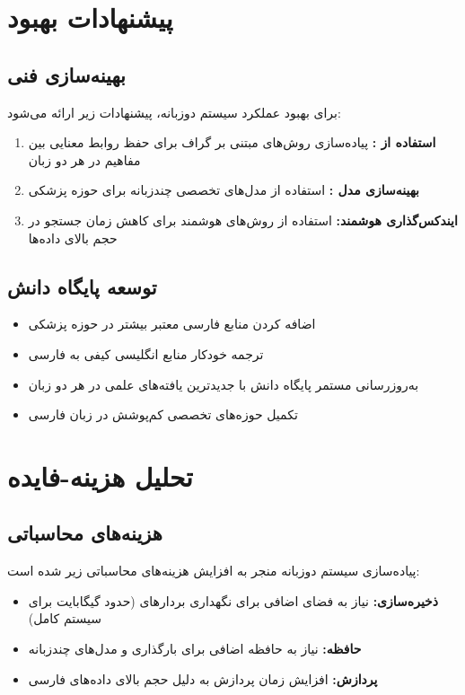 \documentclass[11pt, a4paper, oneside]{book}
\begin{document}
	\section{پیشنهادات بهبود}

	\subsection{بهینه‌سازی فنی}
	برای بهبود عملکرد سیستم  دوزبانه، پیشنهادات زیر ارائه می‌شود:

	\begin{enumerate}
		\item \textbf{استفاده از :} پیاده‌سازی روش‌های مبتنی بر گراف برای حفظ روابط معنایی بین مفاهیم در هر دو زبان \cite{edge_local_2024}
		\item \textbf{بهینه‌سازی مدل :} استفاده از مدل‌های  تخصصی چندزبانه برای حوزه پزشکی
		\item \textbf{ایندکس‌گذاری هوشمند:} استفاده از روش‌های هوشمند برای کاهش زمان جستجو در حجم بالای داده‌ها
	\end{enumerate}

	\subsection{توسعه پایگاه دانش}
	\begin{itemize}
		\item اضافه کردن منابع فارسی معتبر بیشتر در حوزه پزشکی
		\item ترجمه خودکار منابع انگلیسی کیفی به فارسی
		\item به‌روزرسانی مستمر پایگاه دانش با جدیدترین یافته‌های علمی در هر دو زبان
		\item تکمیل حوزه‌های تخصصی کم‌پوشش در زبان فارسی
	\end{itemize}

	\section{تحلیل هزینه-فایده}

	\subsection{هزینه‌های محاسباتی}
	پیاده‌سازی سیستم  دوزبانه منجر به افزایش هزینه‌های محاسباتی زیر شده است:

	\begin{itemize}
		\item \textbf{ذخیره‌سازی:} نیاز به فضای اضافی برای نگهداری بردارهای  (حدود  گیگابایت برای سیستم کامل)
		\item \textbf{حافظه:} نیاز به حافظه اضافی برای بارگذاری  و مدل‌های  چندزبانه
		\item \textbf{پردازش:} افزایش زمان پردازش به دلیل حجم بالای داده‌های فارسی
	\end{itemize}
\end{document}
